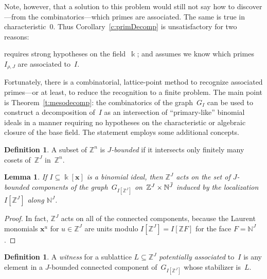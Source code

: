 \documentclass[12pt]{amsart}
\numberwithin{equation}{section}
\newtheorem{lemma}[thm]{Lemma}
\theoremstyle{definition}
\newtheorem{defn}[thm]{Definition}
\begin{document}
Note, however, that a solution to this problem would still not say how
to discover---from the combinatorics---which primes are associated.
The same is true in characteristic~$0$.  Thus
Corollary~\ref{c:primDecomp} is unsatisfactory for two reasons:
\begin{itemize}
\itemit requires strong hypotheses on the field~${\Bbbk}$; and
\itemit assumes we know which primes $I_{\rho,J}$ are associated to~$I$.
\end{itemize}
Fortunately, there is a combinatorial, lattice-point method to
recognize associated primes---or at least, to reduce the recognition
to a finite problem.  The main point is Theorem~\ref{t:mesodecomp}:
the combinatorics of the graph~$G_I$ can be used to construct a
decomposition of~$I$ as an intersection of ``primary-like'' binomial
ideals in a manner requiring no hypotheses on the characteristic or
algebraic closure of the base field.
The statement employs some additional concepts.

\begin{defn}
A subset of ${\mathbb{Z}}^n$ is \emph{$J$-bounded} if it intersects only
finitely many cosets of~${\mathbb{Z}}^J$ in~${\mathbb{Z}}^n$.
\end{defn}

\begin{lemma}
If $I \subseteq {\Bbbk}[{\mathbf{x}}]$ is a binomial ideal, then ${\mathbb{Z}}^J$ acts on
the set of $J$-bounded
components of the graph~$G_{I[{\mathbb{Z}}^J]}$ on~${\mathbb{Z}}^J \times {\mathbb{N}}^{{\hspace{.45ex}\overline{\hspace{-.45ex}J}}}$
induced by the localization~$I[{\mathbb{Z}}^J]$ along
${\mathbb{N}}^J$.
\end{lemma}
\begin{proof}
In fact, ${\mathbb{Z}}^J$ acts on all of the connected components, because the
Laurent monomials ${\mathbf{x}}^u$ for $u \in {\mathbb{Z}}^J$ are units modulo $I[{\mathbb{Z}}^J]
= I[{\mathbb{Z}} F]$ for the face $F = {\mathbb{N}}^J$.
\end{proof}

\begin{defn}\label{d:L}
A \emph{witness} for a sublattice $L \subseteq {\mathbb{Z}}^J$
\emph{potentially associated} to~$I$
is any element in a $J$-bounded connected component of~$G_{I[{\mathbb{Z}}^J]}$
whose stabilizer is~$L$.
\end{defn}
\end{document}
